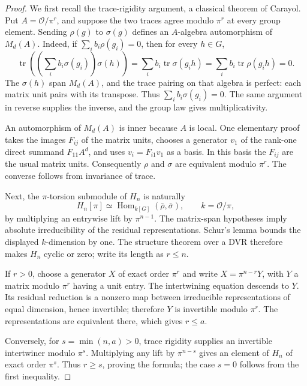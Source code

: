 \begin{proof}
We first recall the trace-rigidity argument, a classical theorem of
Carayol.  Put $A=\mathcal O/\pi^r$, and suppose the two traces agree
modulo $\pi^r$ at every group element.  Sending $\rho(g)$ to $\sigma(g)$
defines an $A$-algebra automorphism of $M_d(A)$.  Indeed, if
$\sum_i b_i\rho(g_i)=0$, then for every $h\in G$,
\[
 \operatorname{tr}\left(\left(\sum_i b_i\sigma(g_i)\right)\sigma(h)\right)
 =\sum_i b_i\operatorname{tr}\sigma(g_i h)
 =\sum_i b_i\operatorname{tr}\rho(g_i h)=0.
\]
The $\sigma(h)$ span $M_d(A)$, and the trace pairing on that algebra
is perfect: each matrix unit pairs with its transpose.  Thus
$\sum_i b_i\sigma(g_i)=0$.  The same argument in reverse supplies the
inverse, and the group law gives multiplicativity.

An automorphism of $M_d(A)$ is inner because $A$ is local.  One elementary
proof takes the images $F_{ij}$ of the matrix units, chooses a generator
$v_1$ of the rank-one direct summand $F_{11}A^d$, and uses
$v_i=F_{i1}v_1$ as a basis.  In this basis the $F_{ij}$ are the usual
matrix units.  Consequently $\rho$ and $\sigma$ are equivalent modulo
$\pi^r$.  The converse follows from invariance of trace.

Next, the $\pi$-torsion submodule of $H_n$ is naturally
\[
 H_n[\pi]\simeq
 \operatorname{Hom}_{k[G]}(\bar\rho,\bar\sigma),
 \qquad k=\mathcal O/\pi,
\]
by multiplying an entrywise lift by $\pi^{n-1}$.  The matrix-span
hypotheses imply absolute irreducibility of the residual representations.
Schur's lemma bounds the displayed $k$-dimension by one.  The structure
theorem over a DVR therefore makes $H_n$ cyclic or zero; write its
length as $r\leq n$.

If $r>0$, choose a generator $X$ of exact order $\pi^r$ and write
$X=\pi^{n-r}Y$, with $Y$ a matrix modulo $\pi^r$ having a unit entry.
The intertwining equation descends to $Y$.  Its residual reduction is
a nonzero map between irreducible representations of equal dimension,
hence invertible; therefore $Y$ is invertible modulo $\pi^r$.
The representations are equivalent there, which gives $r\leq a$.

Conversely, for $s=\min(n,a)>0$, trace rigidity supplies an invertible
intertwiner modulo $\pi^s$.  Multiplying any lift by $\pi^{n-s}$
gives an element of $H_n$ of exact order $\pi^s$.  Thus $r\geq s$,
proving the formula; the case $s=0$ follows from the first inequality.
\end{proof}

